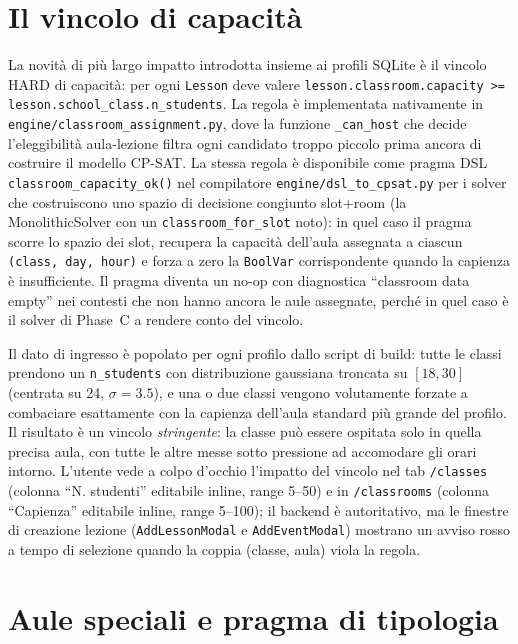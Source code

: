 \section{Il vincolo di capacit\`a}

La novit\`a di pi\`u largo impatto introdotta insieme ai profili
SQLite \`e il vincolo HARD di capacit\`a: per ogni \texttt{Lesson}
deve valere \texttt{lesson.classroom.capacity >=
lesson.school\_class.n\_students}. La regola \`e implementata
nativamente in \texttt{engine/classroom\_assignment.py}, dove la
funzione \texttt{\_can\_host} che decide l'eleggibilit\`a aula-lezione
filtra ogni candidato troppo piccolo prima ancora di costruire il
modello CP-SAT. La stessa regola \`e disponibile come pragma DSL
\texttt{classroom\_capacity\_ok()} nel compilatore
\texttt{engine/dsl\_to\_cpsat.py} per i solver che costruiscono
uno spazio di decisione congiunto slot+room (la
MonolithicSolver con un \texttt{classroom\_for\_slot} noto): in
quel caso il pragma scorre lo spazio dei slot, recupera la
capacit\`a dell'aula assegnata a ciascun \texttt{(class, day, hour)}
e forza a zero la \texttt{BoolVar} corrispondente quando la
capienza \`e insufficiente. Il pragma diventa un no-op con
diagnostica ``classroom data empty'' nei contesti che non hanno
ancora le aule assegnate, perch\'e in quel caso \`e il solver di
Phase~C a rendere conto del vincolo.

Il dato di ingresso \`e popolato per ogni profilo dallo script di
build: tutte le classi prendono un \texttt{n\_students} con
distribuzione gaussiana troncata su $[18, 30]$ (centrata su 24,
$\sigma=3.5$), e una o due classi vengono volutamente forzate a
combaciare esattamente con la capienza dell'aula standard pi\`u
grande del profilo. Il risultato \`e un vincolo \emph{stringente}:
la classe pu\`o essere ospitata solo in quella precisa aula, con
tutte le altre messe sotto pressione ad accomodare gli orari
intorno. L'utente vede a colpo d'occhio l'impatto del vincolo nel
tab \texttt{/classes} (colonna ``N. studenti'' editabile inline,
range 5--50) e in \texttt{/classrooms} (colonna ``Capienza''
editabile inline, range 5--100); il backend \`e autoritativo,
ma le finestre di creazione lezione (\texttt{AddLessonModal} e
\texttt{AddEventModal}) mostrano un avviso rosso a tempo di
selezione quando la coppia (classe, aula) viola la regola.

\section{Aule speciali e pragma di tipologia}

